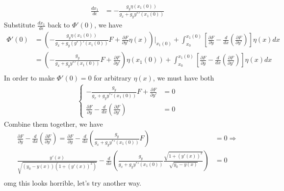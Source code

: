\documentclass[conference,onecolumn]{IEEEtran}
\begin{document}
\begin{enumerate}
\begin{align*}
                  \frac{dx_1}{d\epsilon}                                                                                                                                                                    & = - \frac{g_y \eta(x_1(0))}{g_x + g_y {y^*}'(x_1(0))}
            \end{align*}
            Substitute $\frac{dx_1}{d\epsilon}$ back to $\Phi'(0)$, we have
            \begin{align*}
                  \Phi'(0) & = \left( - \frac{g_y \eta(x_1(0))}{g_x + g_y (y^*)'(x_1(0))} F + \frac{\partial F}{\partial y'} \eta(x) \right) \bigg|_{x_1(0)} + \int_{x_0}^{x_1(0)} \left[ \frac{\partial F}{\partial y} - \frac{d}{dx} \left( \frac{\partial F}{\partial y'} \right) \right] \eta(x) dx \\
                           & = \left( - \frac{g_y}{g_x + g_y {y^*}'(x_1(0))} F + \frac{\partial F}{\partial y'} \right) \eta(x_1(0)) + \int_{x_0}^{x_1(0)} \left[ \frac{\partial F}{\partial y} - \frac{d}{dx} \left( \frac{\partial F}{\partial y'} \right) \right] \eta(x) dx                         \\
            \end{align*}
            In order to make $\Phi'(0) = 0$ for arbitrary $\eta(x)$, we must have both
            \begin{align*}
                  \begin{cases}
                        - \frac{g_y}{g_x + g_y {y^*}'(x_1(0))} F + \frac{\partial F}{\partial y'}                  & = 0 \\
                        \frac{\partial F}{\partial y} - \frac{d}{dx} \left( \frac{\partial F}{\partial y'} \right) & = 0
                  \end{cases}
            \end{align*}
            Combine them together, we have
            \begin{align*}
                  \frac{\partial F}{\partial y} - \frac{d}{dx} \left( \frac{\partial F}{\partial y'} \right)                    = \frac{\partial F}{\partial y} - \frac{d}{dx} \left( \frac{g_y}{g_x + g_y {y^*}'(x_1(0))} F \right) & = 0 \Rightarrow \\
                  \frac{y'(x)}{\sqrt{(y_0 - y(x))(1 + (y'(x))^2)}} - \frac{d}{dx} \left( \frac{g_y}{g_x + g_y {y^*}'(x_1(0))} \frac{\sqrt{1 + (y'(x))^2}}{\sqrt{y_0 - y(x)}} \right)                                                 & = 0             \\
            \end{align*}
            omg this looks horrible, let's try another way.


\end{enumerate}
\end{document}
